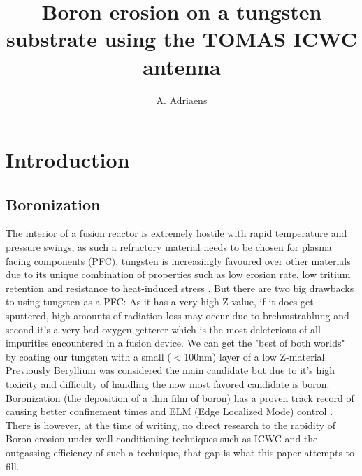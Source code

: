 \documentclass{article}
\title{Boron erosion on a tungsten substrate using the TOMAS ICWC antenna}
\author[1,2]{A. Adriaens}
\affil[1]{Laboratory for Plasma Physics LPP-ERM/KMS, Brussels, Belgium}
\affil[2]{Department of Applied Physics, Ghent University, Belgium}
\date{}
\begin{document}
\maketitle
\section{Introduction}
\subsection{Boronization}
The interior of a fusion reactor is extremely hostile with rapid temperature
and pressure swings, as such a refractory material needs to be chosen for
plasma facing components (PFC), tungsten is increasingly favoured over other
materials due to its unique combination of properties such as low erosion rate,
low tritium retention and resistance to heat-induced stress
\cite{PHILIPPS2011S2}\cite{Tungsten}.  But there are two big drawbacks to using
tungsten as a PFC: As it has a very high Z-value, if it does get sputtered,
high amounts of radiation loss may occur due to brehmstrahlung
\cite{JWinter_1996} and second it's a very bad oxygen getterer which is the
most deleterious of all impurities encountered in a fusion device. We can get
the "best of both worlds" by coating our tungsten with a small ($<$100nm) layer
of a low Z-material.  Previously Beryllium was considered the main candidate
but due to it's high toxicity and difficulty of handling the now most favored
candidate is boron.  Boronization (the deposition of a thin film of boron) has
a proven track record of causing better confinement times and ELM (Edge
Localized Mode) control
\cite{ASDEXBoronisation}\cite{DIII-DBoronisation}\cite{EASTBoronisation}\cite{TEXTORBoronisation}.
There is however, at the time of writing, no direct research to the rapidity of
Boron erosion under wall conditioning techniques such as ICWC and the
outgassing efficiency of such a technique, that gap is what this paper attempts
to fill.
\end{document}

